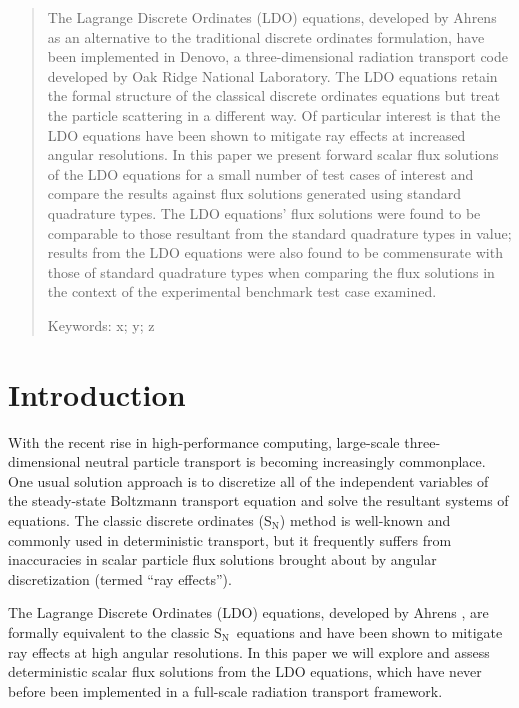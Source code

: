\documentclass{article} %
\newcommand{\sn}{S$_\mathrm{N}$}
\begin{document}
\begin{abstract}
{
The Lagrange Discrete Ordinates (LDO) equations, developed by Ahrens as an
alternative to the traditional discrete ordinates formulation, have been
implemented in Denovo, a three-dimensional radiation transport code developed
by Oak Ridge National Laboratory. The LDO equations retain the formal structure
of the classical discrete ordinates equations but treat the particle scattering
in a different way. Of particular interest is that the LDO equations have been
shown to mitigate ray effects at increased angular resolutions. In this paper
we present forward scalar flux solutions of the LDO equations for a small
number of test cases of interest and compare the results against flux solutions
generated using standard quadrature types. The LDO equations' flux solutions
were found to be comparable to those resultant from the standard quadrature
types in value; results from the LDO equations were also found to be
commensurate with those of standard quadrature types when comparing the flux
solutions in the context of the experimental benchmark test case examined.

Keywords: x; y; z
}
\end{abstract}

\pagebreak

\section{Introduction}
\label{sec:intro}

With the recent rise in high-performance computing, large-scale 
three-dimensional neutral particle transport is becoming increasingly
commonplace. One usual solution approach is to discretize all of the
independent variables of the steady-state Boltzmann transport equation and
solve the resultant systems of equations. The classic discrete ordinates (\sn)
method is well-known and commonly used in deterministic transport, but it
frequently suffers from inaccuracies in scalar particle flux solutions
brought about by angular discretization (termed ``ray effects'').

The Lagrange Discrete Ordinates (LDO) equations, developed by Ahrens
\cite{ahrens}, are formally equivalent to the classic \sn\ equations and have
been shown to mitigate ray effects at high angular resolutions.
In this paper we will explore and assess deterministic scalar flux solutions
from the LDO equations, which have never before
been implemented in a full-scale radiation transport framework.
\end{document}
